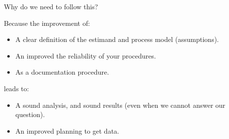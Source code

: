 \begin{lhframe}[rhgraphic={\texttt{[image: DAG\_to\_research.png]}}]
	{Why do we need to follow this?}
	
	Because the improvement of:
	\begin{itemize}
		\item A clear definition of the estimand and process model (assumptions).
		\item An improved the reliability of your procedures.
		\item As a documentation procedure.
	\end{itemize}
	
	leads to:
	\begin{itemize}
		\item A sound analysis, and sound results \alert{(even when we cannot answer our question)}.
		\item An improved planning to get data.
	\end{itemize}
\end{lhframe}
%
%